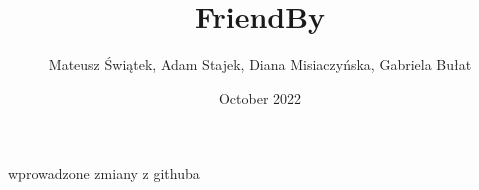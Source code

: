 \documentclass{article}
\title{FriendBy}
\author{Mateusz Świątek, Adam Stajek, Diana Misiaczyńska, Gabriela Bułat }
\date{October 2022}
\begin{document}
\maketitle

wprowadzone zmiany z githuba






\end{document}
